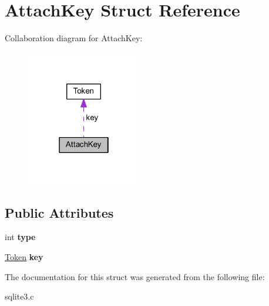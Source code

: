 \hypertarget{struct_attach_key}{\section{Attach\-Key Struct Reference}
\label{struct_attach_key}
}


Collaboration diagram for Attach\-Key\-:\nopagebreak
\begin{figure}[H]
\begin{center}
\leavevmode
\includegraphics[width=142pt]{struct_attach_key__coll__graph}
\end{center}
\end{figure}
\subsection*{Public Attributes}
\begin{DoxyCompactItemize}
\item 
\hypertarget{struct_attach_key_acd780bfae7415a79a90fa5ceb41515cd}{int {\bfseries type}}\label{struct_attach_key_acd780bfae7415a79a90fa5ceb41515cd}

\item 
\hypertarget{struct_attach_key_a267449f11a142a3b88c54aa01f842ad0}{\hyperlink{struct_token}{Token} {\bfseries key}}\label{struct_attach_key_a267449f11a142a3b88c54aa01f842ad0}

\end{DoxyCompactItemize}


The documentation for this struct was generated from the following file\-:\begin{DoxyCompactItemize}
\item 
sqlite3.\-c\end{DoxyCompactItemize}
